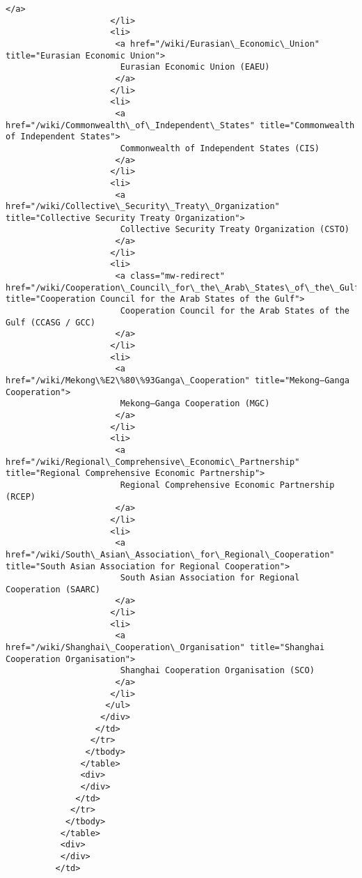 \documentclass[11pt]{article}
\begin{document}
\begin{Verbatim}[commandchars=\\\{\}]
                      </a>
                     </li>
                     <li>
                      <a href="/wiki/Eurasian\_Economic\_Union" title="Eurasian Economic Union">
                       Eurasian Economic Union (EAEU)
                      </a>
                     </li>
                     <li>
                      <a href="/wiki/Commonwealth\_of\_Independent\_States" title="Commonwealth of Independent States">
                       Commonwealth of Independent States (CIS)
                      </a>
                     </li>
                     <li>
                      <a href="/wiki/Collective\_Security\_Treaty\_Organization" title="Collective Security Treaty Organization">
                       Collective Security Treaty Organization (CSTO)
                      </a>
                     </li>
                     <li>
                      <a class="mw-redirect" href="/wiki/Cooperation\_Council\_for\_the\_Arab\_States\_of\_the\_Gulf" title="Cooperation Council for the Arab States of the Gulf">
                       Cooperation Council for the Arab States of the Gulf (CCASG / GCC)
                      </a>
                     </li>
                     <li>
                      <a href="/wiki/Mekong\%E2\%80\%93Ganga\_Cooperation" title="Mekong–Ganga Cooperation">
                       Mekong–Ganga Cooperation (MGC)
                      </a>
                     </li>
                     <li>
                      <a href="/wiki/Regional\_Comprehensive\_Economic\_Partnership" title="Regional Comprehensive Economic Partnership">
                       Regional Comprehensive Economic Partnership (RCEP)
                      </a>
                     </li>
                     <li>
                      <a href="/wiki/South\_Asian\_Association\_for\_Regional\_Cooperation" title="South Asian Association for Regional Cooperation">
                       South Asian Association for Regional Cooperation (SAARC)
                      </a>
                     </li>
                     <li>
                      <a href="/wiki/Shanghai\_Cooperation\_Organisation" title="Shanghai Cooperation Organisation">
                       Shanghai Cooperation Organisation (SCO)
                      </a>
                     </li>
                    </ul>
                   </div>
                  </td>
                 </tr>
                </tbody>
               </table>
               <div>
               </div>
              </td>
             </tr>
            </tbody>
           </table>
           <div>
           </div>
          </td>

\end{Verbatim}
\end{document}
